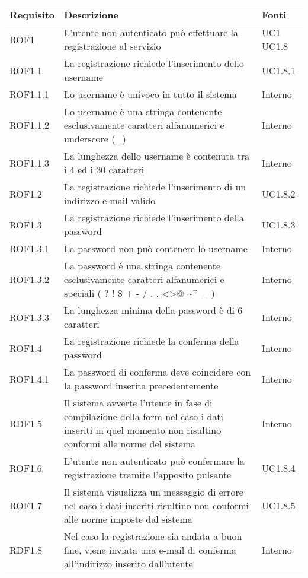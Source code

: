\begin{center}

	\def\arraystretch{1.5}
	\bgroup
	\begin{longtable}{| p{2.5cm} | p{8cm} | p{2cm} |}

		\hline
		\textbf{Requisito} & \textbf{Descrizione} & \textbf{Fonti} \\
		\hline


		ROF1  &  L'utente non autenticato può effettuare la registrazione al servizio  & UC1 \newline UC1.8 \\
		\hline
		ROF1.1  &  La registrazione richiede l'inserimento dello username  &  UC1.8.1 \\
		\hline
		ROF1.1.1  &  Lo username è univoco in tutto il sistema  &  Interno \\
		\hline
		ROF1.1.2  &  Lo username è una stringa contenente esclusivamente caratteri alfanumerici e underscore (\_)  &  Interno \\
		\hline
		ROF1.1.3  &  La lunghezza dello username è contenuta tra i 4 ed i 30 caratteri  &  Interno \\
		\hline
		ROF1.2  &  La registrazione richiede l'inserimento di un indirizzo e-mail valido &  UC1.8.2 \\
		\hline
		ROF1.3  &  La registrazione richiede l'inserimento della password  &  UC1.8.3 \\
		\hline
		ROF1.3.1  &  La password non può contenere lo username  &  Interno \\
		\hline
		ROF1.3.2  &  La password è una stringa contenente esclusivamente caratteri alfanumerici e speciali ( ? ! \$ + - / . , \textless \textgreater $@$ \textasciitilde \^{} \_ )  &  Interno \\
		\hline
		ROF1.3.3  &  La lunghezza minima della password è di 6 caratteri  &  Interno \\
		\hline
		ROF1.4  &  La registrazione richiede la conferma della password  &  Interno \\
		\hline
		ROF1.4.1  &  La password di conferma deve coincidere con la password inserita precedentemente  &  Interno \\
		\hline
		RDF1.5  &  Il sistema avverte l'utente in fase di compilazione della form nel caso i dati inseriti in quel momento non risultino conformi alle norme del sistema  &  Interno \\
		\hline
		ROF1.6  &  L'utente non autenticato può confermare la registrazione tramite l'apposito pulsante  &  UC1.8.4 \\
		\hline
		ROF1.7  &  Il sistema visualizza un messaggio di errore nel caso i dati inseriti risultino non conformi alle norme imposte dal sistema  &  UC1.8.5 \\
		\hline
		RDF1.8  &  Nel caso la registrazione sia andata a buon fine, viene inviata una e-mail di conferma all'indirizzo inserito dall'utente  &  Interno \\
		\hline


\end{longtable}
\end{center}
